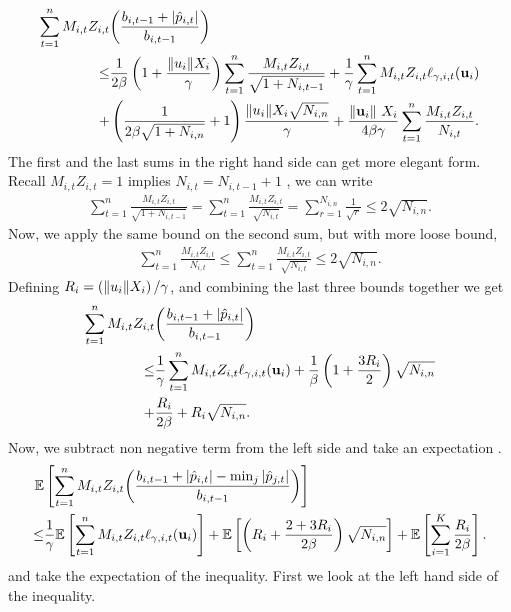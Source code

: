 \begin{equation*}
\begin{split}
\sum_{t=1}^{n}M_{i,t}Z_{i,t}&{\left({\frac{b_{i,t-1} +\left\vert{\hat{p}_{i,t}}\right\vert}{b_{i,t-1}}}\right)}\\
\le &\frac{1}{2\beta}\left({1+\frac{\Vert u_i\Vert X_i}{\gamma}}\right)\sum_{t=1}^{n}{\frac{M_{i,t}Z_{i,t}}{\sqrt{1+N_{i,t-1}}}}
+\frac{1}{\gamma}\sum_{t=1}^{n}{M_{i,t}Z_{i,t}}\ell_{\gamma,i,t}(\mathbf{u}_i)\\
+&\left({\frac{1}{2\beta\sqrt{1+N_{i,n}}}+1}\right)\frac{{\Vert u_i\Vert}X_i\sqrt{N_{i,n}}}{\gamma}
+\frac{\Vert\mathbf{u}_i\Vert~ X_i}{4\beta\gamma}\sum_{t=1}^{n}{\frac{M_{i,t}Z_{i,t}}{N_{i,t}}}.
\end{split}
\end{equation*} 
The first and the last sums in the right hand side can get more elegant form. Recall $M_{i,t}Z_{i,t}=1$ implies $N_{i,t}=N_{i,t-1}+1$ , we can write  
\begin{equation*}
\begin{split}
\sum_{t=1}^{n}{\frac{M_{i,t}Z_{i,t}}{\sqrt{1+N_{i,t-1}}}}
=\sum_{t=1}^{n}{\frac{M_{i,t}Z_{i,t}}{\sqrt{N_{i,t}}}}
=\sum_{r=1}^{N_{i,n}}{\frac{1}{\sqrt{r}}} 
\le 2\sqrt{N_{i,n}}.
\end{split}
\end{equation*}
Now, we apply the same bound on the second sum, but with more loose bound, \begin{equation*}
\begin{split}
\sum_{t=1}^{n}{\frac{M_{i,t}Z_{i,t}}{N_{i,t}}}
\le\sum_{t=1}^{n}{\frac{M_{i,t}Z_{i,t}}{\sqrt{N_{i,t}}}} 
\le 2\sqrt{N_{i,n}}. 
\end{split}
\end{equation*}
Defining $R_i=\left({\Vert u_i\Vert X_i}\right)/{\gamma}$, and combining the last three bounds together we get
\begin{equation*}
\begin{split}
\sum_{t=1}^{n}M_{i,t}Z_{i,t}&{\left({\frac{b_{i,t-1} +\left\vert{\hat{p}_{i,t}}\right\vert}{b_{i,t-1}}}\right)}\\
\le &\frac{1}{\gamma}\sum_{t=1}^{n}{M_{i,t}Z_{i,t}}\ell_{\gamma,i,t}(\mathbf{u}_i)
+\frac{1}{\beta}\left({1+\frac{3R_{i}}{2}}\right)\sqrt{N_{i,n}}
\\
+&\frac{R_i}{2\beta}+R_{i}\sqrt{N_{i,n}}.
\end{split}
\end{equation*}
Now, we subtract non negative term from the left side and take an  expectation .
\begin{equation*}
\begin{split}  
\mathbb{E}&\left[{\sum_{t=1}^{n}M_{i,t}Z_{i,t}{\left({\frac{b_{i,t-1} +\left\vert{\hat{p}_{i,t}}\right\vert-\min_j\left\vert{\hat{p}_{j,t}}\right\vert}{b_{i,t-1}}}\right)}}\right]\\
\le &\frac{1}{\gamma}\mathbb{E}\left[{\sum_{t=1}^{n}{M_{i,t}Z_{i,t}}\ell_{\gamma,i,t}(\mathbf{u}_i)}\right]
+\mathbb{E}\left[{\left({R_{i}+\frac{2+3R_{i}}{2\beta}}\right)\sqrt{N_{i,n}}}\right]
+\mathbb{E}\left[{\sum_{i=1}^{K}\frac{R_i}{2\beta}}\right].
\end{split}
\end{equation*}
and take the expectation of the inequality. First we look at the left hand side of the inequality.

